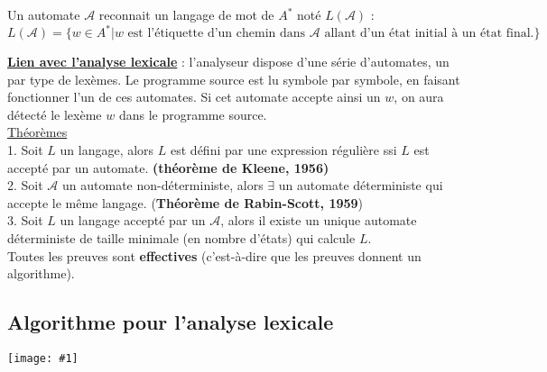 \documentclass{article}
\newcommand{\imag}[1]{\begin{center}\texttt{[image: \#1]}\end{center}}
\newcommand{\stitre}[1]{\noindent\textbf{\underline{#1}}}
\begin{document}
\noindent Un automate $\mathscr{A}$ reconnait un langage de mot de $A^*$ noté $L(\mathscr{A})$ : 
\[
L(\mathscr{A}) = \{w\in A^* |w \text{ est l'étiquette d'un chemin dans } \mathscr{A} \text{ allant d'un état initial à un état final.} \}
\]

\stitre{Lien avec l'analyse lexicale} : l'analyseur dispose d'une série d'automates, un par type de lexèmes. Le programme source est lu symbole par symbole, en faisant fonctionner 
l'un de ces automates. Si cet automate accepte ainsi un $w$, on aura détecté le lexème $w$ dans le programme source.\\

\noindent \underline{Théorèmes} \\
1. Soit $L$ un langage, alors $L$ est défini par une expression régulière ssi $L$ est accepté par un automate. \textbf{(théorème de Kleene, 1956)} \\
2. Soit $\mathscr{A}$ un automate non-déterministe, alors $\exists$ un automate déterministe qui accepte le même langage. (\textbf{Théorème de Rabin-Scott, 1959}) \\
3. Soit $L$ un langage accepté par un $\mathscr{A}$, alors il existe un unique automate déterministe de taille minimale (en nombre d'états) qui calcule $L$. \\
Toutes les preuves sont \textbf{effectives} (c'est-à-dire que les preuves donnent un algorithme).

\subsection{Algorithme pour l'analyse lexicale}

\imag{comp2.png}
\end{document}
